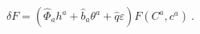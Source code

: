 \begin{equation}
\delta F = ({\hat\Phi}_a h^a + {\hat b}_a \theta^a + {\hat q} \varepsilon) F(C^a, c^a)~.  \label{eq:byetmisbir}
\end{equation}

